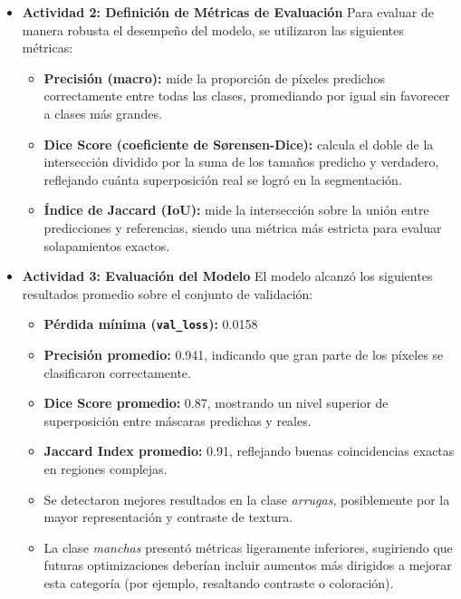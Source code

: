\begin{enumerate}
\begin{itemize}
\vspace{0.5cm}

  \item\textbf{Actividad 2: Definición de Métricas de Evaluación}
  Para evaluar de manera robusta el desempeño del modelo, se utilizaron las siguientes métricas:
\begin{itemize}
  \item \textbf{Precisión (macro):} mide la proporción de píxeles predichos correctamente entre todas las clases, promediando por igual sin favorecer a clases más grandes.
  \item \textbf{Dice Score (coeficiente de Sørensen-Dice):} calcula el doble de la intersección dividido por la suma de los tamaños predicho y verdadero, reflejando cuánta superposición real se logró en la segmentación.
  \item \textbf{Índice de Jaccard (IoU):} mide la intersección sobre la unión entre predicciones y referencias, siendo una métrica más estricta para evaluar solapamientos exactos.
\end{itemize}

\vspace{0.5cm}

  \item\textbf{Actividad 3: Evaluación del Modelo}
  El modelo alcanzó los siguientes resultados promedio sobre el conjunto de validación:
\begin{itemize}
  \item \textbf{Pérdida mínima (\texttt{val\_loss}):} 0.0158 
  \item \textbf{Precisión promedio:} 0.941, indicando que gran parte de los píxeles se clasificaron correctamente.
  \item \textbf{Dice Score promedio:} 0.87, mostrando un nivel superior de superposición entre máscaras predichas y reales.
  \item \textbf{Jaccard Index promedio:} 0.91, reflejando buenas coincidencias exactas en regiones complejas.
  \item Se detectaron mejores resultados en la clase \emph{arrugas}, posiblemente por la mayor representación y contraste de textura.
  \item La clase \emph{manchas} presentó métricas ligeramente inferiores, sugiriendo que futuras optimizaciones deberían incluir aumentos más dirigidos a mejorar esta categoría (por ejemplo, resaltando contraste o coloración).
\end{itemize}

\vspace{0.5cm}


\end{itemize}
\end{enumerate}

